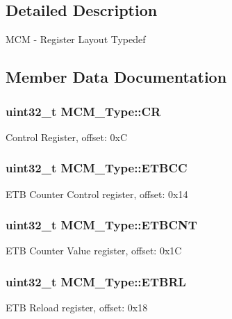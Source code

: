 \subsection{Detailed Description}
M\+CM -\/ Register Layout Typedef 

\subsection{Member Data Documentation}
\subsubsection[{\texorpdfstring{CR}{CR}}]{ uint32\+\_\+t M\+C\+M\+\_\+\+Type\+::\+CR}\hypertarget{structMCM__Type_ac703b93883db7ce06bb9a6b6222a7e6f}{}\label{structMCM__Type_ac703b93883db7ce06bb9a6b6222a7e6f}
Control Register, offset\+: 0xC 
\subsubsection[{\texorpdfstring{E\+T\+B\+CC}{ETBCC}}]{ uint32\+\_\+t M\+C\+M\+\_\+\+Type\+::\+E\+T\+B\+CC}\hypertarget{structMCM__Type_a7e5af94b540eca88f8332c0eae3b11dd}{}\label{structMCM__Type_a7e5af94b540eca88f8332c0eae3b11dd}
E\+TB Counter Control register, offset\+: 0x14 
\subsubsection[{\texorpdfstring{E\+T\+B\+C\+NT}{ETBCNT}}]{ uint32\+\_\+t M\+C\+M\+\_\+\+Type\+::\+E\+T\+B\+C\+NT}\hypertarget{structMCM__Type_a130dd2c21ea8fd8a4e3e3acc41629ff4}{}\label{structMCM__Type_a130dd2c21ea8fd8a4e3e3acc41629ff4}
E\+TB Counter Value register, offset\+: 0x1C 
\subsubsection[{\texorpdfstring{E\+T\+B\+RL}{ETBRL}}]{ uint32\+\_\+t M\+C\+M\+\_\+\+Type\+::\+E\+T\+B\+RL}\hypertarget{structMCM__Type_a67931589db87c44b6387d38d78a7268e}{}\label{structMCM__Type_a67931589db87c44b6387d38d78a7268e}
E\+TB Reload register, offset\+: 0x18 
